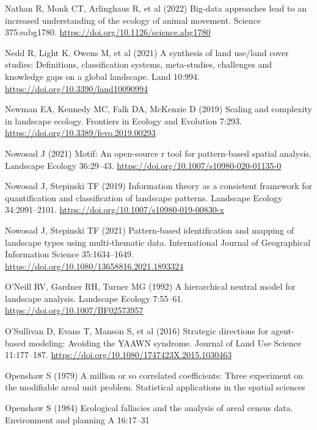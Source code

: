 \documentclass[
  10pt,
  a4paperpaper,
]{article}
\newlength{\cslhangindent}
\newenvironment{CSLReferences}[2] %
 {\begin{list}{}{%
  \setlength{\itemindent}{0pt}
  \setlength{\leftmargin}{0pt}
  \setlength{\parsep}{0pt}
  \ifodd #1
   \setlength{\leftmargin}{\cslhangindent}
   \setlength{\itemindent}{-1\cslhangindent}
  \fi
  \setlength{\itemsep}{#2\baselineskip}}}
 {\end{list}}
\begin{document}
\begin{CSLReferences}{1}{1}
Nathan R, Monk CT, Arlinghaus R, et al (2022) Big-data approaches lead
to an increased understanding of the ecology of animal movement. Science
375:eabg1780. \url{https://doi.org/10.1126/science.abg1780}

Nedd R, Light K, Owens M, et al (2021) A synthesis of land use/land
cover studies: Definitions, classification systems, meta-studies,
challenges and knowledge gaps on a global landscape. Land 10:994.
\url{https://doi.org/10.3390/land10090994}

Newman EA, Kennedy MC, Falk DA, McKenzie D (2019) Scaling and complexity
in landscape ecology. Frontiers in Ecology and Evolution 7:293.
\url{https://doi.org/10.3389/fevo.2019.00293}

Nowosad J (2021) Motif: An open-source r tool for pattern-based spatial
analysis. Landscape Ecology 36:29--43.
\url{https://doi.org/10.1007/s10980-020-01135-0}

Nowosad J, Stepinski TF (2019) Information theory as a consistent
framework for quantification and classification of landscape patterns.
Landscape Ecology 34:2091--2101.
\url{https://doi.org/10.1007/s10980-019-00830-x}

Nowosad J, Stepinski TF (2021) Pattern-based identification and mapping
of landscape types using multi-thematic data. International Journal of
Geographical Information Science 35:1634--1649.
\url{https://doi.org/10.1080/13658816.2021.1893324}

O'Neill RV, Gardner RH, Turner MG (1992) A hierarchical neutral model
for landscape analysis. Landscape Ecology 7:55--61.
\url{https://doi.org/10.1007/BF02573957}

O'Sullivan D, Evans T, Manson S, et al (2016) Strategic directions for
agent-based modeling: Avoiding the YAAWN syndrome. Journal of Land Use
Science 11:177--187. \url{https://doi.org/10.1080/1747423X.2015.1030463}

Openshaw S (1979) A million or so correlated coefficients: Three
experiment on the modifiable areal unit problem. Statistical
applications in the spatial sciences

Openshaw S (1984) Ecological fallacies and the analysis of areal census
data. Environment and planning A 16:17--31


\end{CSLReferences}
\end{document}
